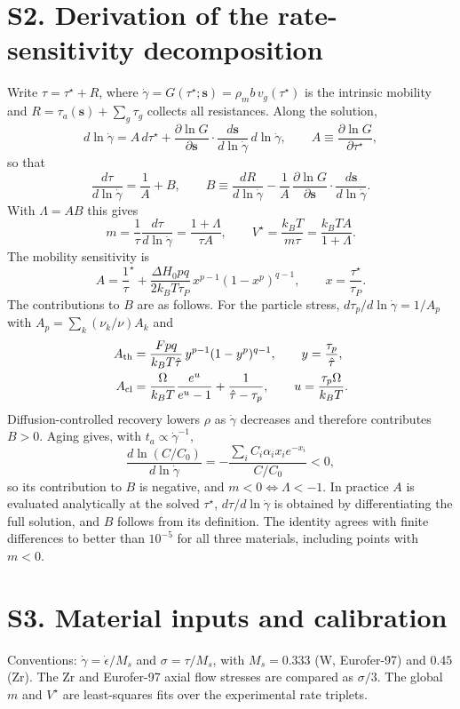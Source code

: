 \documentclass[aps,prl,onecolumn,superscriptaddress,amsmath,amssymb,floatfix]{revtex4-2}
\newcommand{\gd}{\dot\gamma}
\newcommand{\ts}{\tau^{\star}}
\newcommand{\kT}{k_BT}
\begin{document}
\section{S2. Derivation of the rate-sensitivity decomposition}
Write $\tau=\ts+R$, where $\gd=G(\ts;\bm s)=\rho_mb\,v_g(\ts)$ is the intrinsic mobility and $R=\tau_a(\bm s)+\sum_g\tau_g$ collects all resistances. Along the solution,
\begin{equation}
d\ln\gd=A\,d\ts+\frac{\partial\ln G}{\partial\bm s}\cdot\frac{d\bm s}{d\ln\gd}\,d\ln\gd,\qquad A\equiv\frac{\partial\ln G}{\partial\ts},
\end{equation}
so that
\begin{equation}
\frac{d\tau}{d\ln\gd}=\frac1A+B,\qquad
B\equiv\frac{dR}{d\ln\gd}-\frac1A\,\frac{\partial\ln G}{\partial\bm s}\cdot\frac{d\bm s}{d\ln\gd}.
\end{equation}
With $\Lambda=AB$ this gives
\begin{equation}
m=\frac1\tau\frac{d\tau}{d\ln\gd}=\frac{1+\Lambda}{\tau A},\qquad V^\star=\frac{\kT}{m\tau}=\frac{\kT A}{1+\Lambda}.
\end{equation}
The mobility sensitivity is
\begin{equation}
A=\frac1\ts+\frac{\Delta H_0pq}{2\kT\tau_P}\,x^{p-1}(1-x^p)^{q-1},\qquad x=\frac{\ts}{\tau_P}.
\end{equation}
The contributions to $B$ are as follows. For the particle stress, $d\tau_p/d\ln\gd=1/A_p$ with $A_p=\sum_k(\nu_k/\nu)A_k$ and
\begin{align}
A_{\rm th}&=\frac{Fpq}{\kT\hat\tau}\,y^{p-1}(1-y^p)^{q-1},\qquad y=\frac{\tau_p}{\hat\tau},\\
A_{\rm cl}&=\frac{\Omega}{\kT}\frac{e^u}{e^u-1}+\frac{1}{\hat\tau-\tau_p},\qquad u=\frac{\tau_p\Omega}{\kT}.
\end{align}
Diffusion-controlled recovery lowers $\rho$ as $\gd$ decreases and therefore contributes $B>0$. Aging gives, with $t_a\propto\gd^{-1}$,
\begin{equation}
\frac{d\ln(C/C_0)}{d\ln\gd}=-\frac{\sum_iC_i\alpha_ix_ie^{-x_i}}{C/C_0}<0,
\end{equation}
so its contribution to $B$ is negative, and $m<0\iff\Lambda<-1$. In practice $A$ is evaluated analytically at the solved $\ts$, $d\tau/d\ln\gd$ is obtained by differentiating the full solution, and $B$ follows from its definition. The identity agrees with finite differences to better than $10^{-5}$ for all three materials, including points with $m<0$.

\section{S3. Material inputs and calibration}
Conventions: $\gd=\dot\epsilon/M_s$ and $\sigma=\tau/M_s$, with $M_s=0.333$ (W, Eurofer-97) and $0.45$ (Zr). The Zr and Eurofer-97 axial flow stresses are compared as $\sigma/3$. The global $m$ and $V^\star$ are least-squares fits over the experimental rate triplets.
\end{document}
